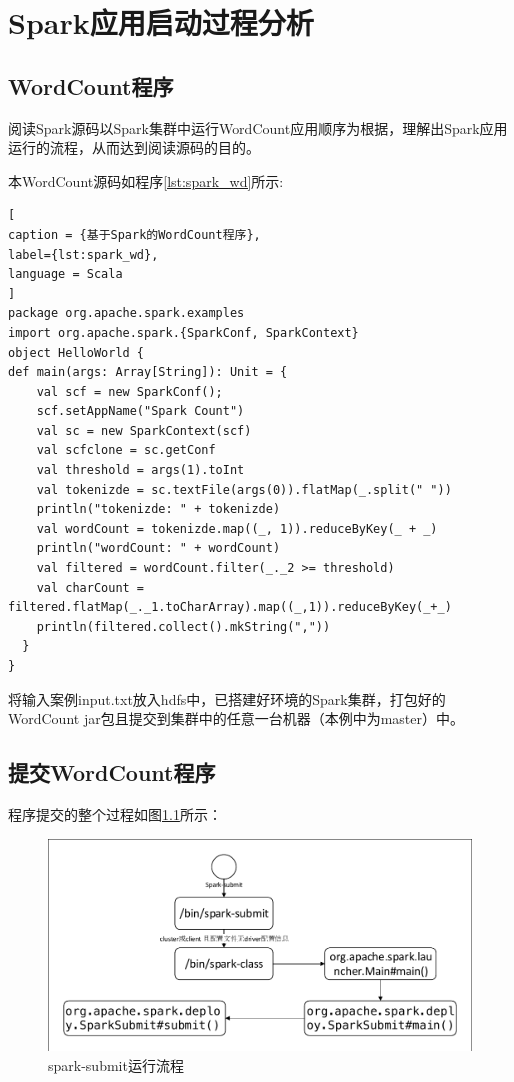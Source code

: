 \chapter{Spark应用启动过程分析}
\label{cha:run_wordcount}
\section{WordCount程序}
\label{sec:spark_wd}
阅读Spark源码以Spark集群中运行WordCount应用顺序为根据，理解出Spark应用运行的流程，从而达到阅读源码的目的。

本WordCount源码如程序\ref{lst:spark_wd}所示:

\begin{lstlisting}[
caption = {基于Spark的WordCount程序},
label={lst:spark_wd},
language = Scala
]
package org.apache.spark.examples
import org.apache.spark.{SparkConf, SparkContext}
object HelloWorld {
def main(args: Array[String]): Unit = {
    val scf = new SparkConf();
    scf.setAppName("Spark Count")
    val sc = new SparkContext(scf)
    val scfclone = sc.getConf
    val threshold = args(1).toInt
    val tokenizde = sc.textFile(args(0)).flatMap(_.split(" "))
    println("tokenizde: " + tokenizde)
    val wordCount = tokenizde.map((_, 1)).reduceByKey(_ + _)
    println("wordCount: " + wordCount)
    val filtered = wordCount.filter(_._2 >= threshold)
    val charCount = filtered.flatMap(_._1.toCharArray).map((_,1)).reduceByKey(_+_)
    println(filtered.collect().mkString(","))
  }
}
\end{lstlisting}

将输入案例input.txt放入hdfs中，已搭建好环境的Spark集群，打包好的WordCount jar包且提交到集群中的任意一台机器（本例中为master）中。

\section{提交WordCount程序}
\label{sec:submit_app}
程序提交的整个过程如图\ref{spark-submit}所示：
\begin{figure}[H] %
	\centering
	\includegraphics{figures/sparksubmit.pdf}
	\caption{spark-submit运行流程}
	\label{spark-submit}
\end{figure}

